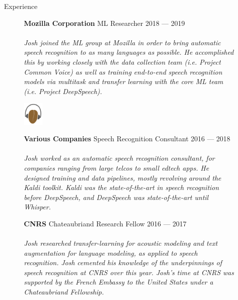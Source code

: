 \documentclass{resume} %
\begin{document}
\begin{rSection}{Experience}
  \begin{figure}[H]
    \begin{minipage}{0.2\textwidth}
      \centering
      
    \end{minipage}
    \begin{minipage}{0.8\textwidth}
      {\bf Mozilla Corporation} \hfill ML Researcher \hfill {2018 --- 2019} \\ \\
      \textit{Josh joined the ML group at Mozilla in order to bring automatic speech recognition to as many languages as possible. He accomplished this by working closely with the data collection team (i.e. Project Common Voice) as well as training end-to-end speech recognition models via multitask and transfer learning with the core ML team (i.e. Project DeepSpeech).} \\
    \end{minipage}
  \end{figure}

  \begin{figure}[H]
    \begin{minipage}{0.2\textwidth}
      \centering
      \includegraphics[width=1cm]{imgs/kaldi-logo.png}
    \end{minipage}
    \begin{minipage}{0.8\textwidth}
      {\bf Various Companies} \hfill Speech Recognition Consultant \hfill {2016 --- 2018} \\ \\
      \textit{Josh worked as an automatic speech recognition consultant, for companies ranging from large telcos to small edtech apps. He designed training and data pipelines, mostly revolving around the Kaldi toolkit. Kaldi was the state-of-the-art in speech recognition before DeepSpeech, and DeepSpeech was state-of-the-art until Whisper.} \\
    \end{minipage}
  \end{figure}

  \begin{figure}[H]
    \begin{minipage}{0.2\textwidth}
      \centering
      
    \end{minipage}
    \begin{minipage}{0.8\textwidth}
      {\bf CNRS} \hfill Chateaubriand Research Fellow  \hfill {2016 --- 2017} \\ \\
      \textit{Josh researched transfer-learning for acoustic modeling and text augmentation for language modeling, as applied to speech recognition. Josh cemented his knowledge of the underpinnings of speech recognition at CNRS over this year. Josh's time at CNRS was supported by the French Embassy to the United States under a Chateaubriand Fellowship.}
    \end{minipage}
  \end{figure}


\end{rSection}
\end{document}
